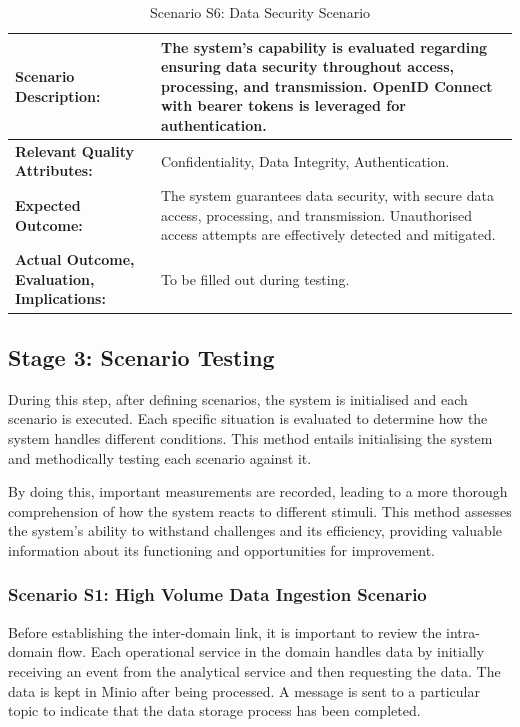 \documentclass[journal]{IEEEtran}
\begin{document}
\begin{table}[tbp]
  \caption{Scenario S6: Data Security Scenario}
  \begin{tabularx}{\textwidth}{|>{\raggedright\arraybackslash}p{5cm}|X|}
  \hline
  \textbf{Scenario Description:} & The system's capability is evaluated regarding ensuring data security throughout access, processing, and transmission. OpenID Connect with bearer tokens is leveraged for authentication. \\
  \hline
  \textbf{Relevant Quality Attributes:} & Confidentiality, Data Integrity, Authentication. \\
  \hline
  \textbf{Expected Outcome:} & The system guarantees data security, with secure data access, processing, and transmission. Unauthorised access attempts are effectively detected and mitigated. \\
  \hline
  \textbf{Actual Outcome, Evaluation, Implications:} & To be filled out during testing. \\
  \hline
  \end{tabularx}
  \label{s6Table}
\end{table}


\subsection{Stage 3: Scenario Testing}

During this step, after defining scenarios, the system is initialised and each scenario is executed. Each specific situation is evaluated to determine how the system handles different conditions. This method entails initialising the system and methodically testing each scenario against it. 

By doing this, important measurements are recorded, leading to a more thorough comprehension of how the system reacts to different stimuli. This method assesses the system's ability to withstand challenges and its efficiency, providing valuable information about its functioning and opportunities for improvement.

\subsubsection{Scenario S1: High Volume Data Ingestion Scenario}

Before establishing the inter-domain link, it is important to review the intra-domain flow. Each operational service in the domain handles data by initially receiving an event from the analytical service and then requesting the data. The data is kept in Minio after being processed. A message is sent to a particular topic to indicate that the data storage process has been completed. 
\end{document}
